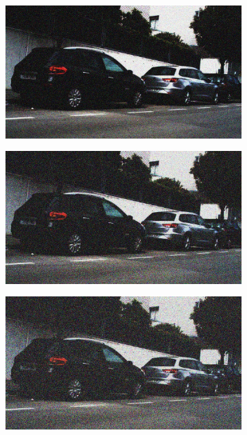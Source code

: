 \documentclass[a4paper]{ctexart}
\begin{document}
\begin{figure}[htbp]
\begin{subfigure}{0.08\textwidth}
			\label{fig：Gamma=0.2, Gauss Noise = 0.1}
		\end{subfigure}
		\begin{subfigure}{0.08\textwidth}
			\captionsetup{font=scriptsize}
			\includegraphics[width=\linewidth]{picture/Edge Detection/degrade/RGB_001 Gamma=0.2, Gauss Noise=0.2}
			\label{fig：Gamma=0.2, Gauss Noise = 0.2}
		\end{subfigure}
		\begin{subfigure}{0.08\textwidth}
			\captionsetup{font=scriptsize}
			\includegraphics[width=\linewidth]{picture/Edge Detection/degrade/RGB_001 Gamma=0.2, Gauss Noise=0.3}
			\label{fig：Gamma=0.2, Gauss Noise = 0.3}
		\end{subfigure}
		\begin{subfigure}{0.08\textwidth}
			\captionsetup{font=scriptsize}
			\includegraphics[width=\linewidth]{picture/Edge Detection/degrade/RGB_001 Gamma=0.2, Gauss Noise=0.4}

\end{subfigure}
\end{figure}
\end{document}
